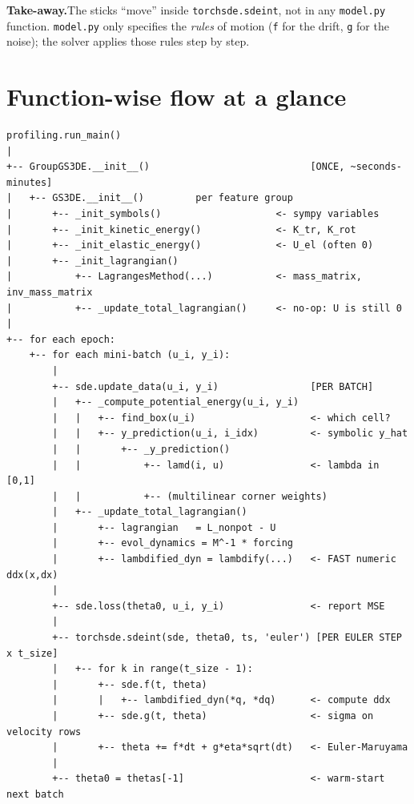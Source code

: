 \documentclass[11pt]{article}
\newcommand{\code}[1]{\texttt{\small #1}}
\begin{document}
\noindent\textbf{Take-away.}\quad The sticks ``move'' inside \code{torchsde.sdeint}, not in any \code{model.py} function. \code{model.py} only specifies the \emph{rules} of motion (\code{f} for the drift, \code{g} for the noise); the solver applies those rules step by step.

\section{Function-wise flow at a glance}

\begin{lstlisting}[basicstyle=\ttfamily\scriptsize]
profiling.run_main()
|
+-- GroupGS3DE.__init__()                            [ONCE, ~seconds-minutes]
|   +-- GS3DE.__init__()         per feature group
|       +-- _init_symbols()                    <- sympy variables
|       +-- _init_kinetic_energy()             <- K_tr, K_rot
|       +-- _init_elastic_energy()             <- U_el (often 0)
|       +-- _init_lagrangian()
|           +-- LagrangesMethod(...)           <- mass_matrix, inv_mass_matrix
|           +-- _update_total_lagrangian()     <- no-op: U is still 0
|
+-- for each epoch:
    +-- for each mini-batch (u_i, y_i):
        |
        +-- sde.update_data(u_i, y_i)                [PER BATCH]
        |   +-- _compute_potential_energy(u_i, y_i)
        |   |   +-- find_box(u_i)                    <- which cell?
        |   |   +-- y_prediction(u_i, i_idx)         <- symbolic y_hat
        |   |       +-- _y_prediction()
        |   |           +-- lamd(i, u)               <- lambda in [0,1]
        |   |           +-- (multilinear corner weights)
        |   +-- _update_total_lagrangian()
        |       +-- lagrangian   = L_nonpot - U
        |       +-- evol_dynamics = M^-1 * forcing
        |       +-- lambdified_dyn = lambdify(...)   <- FAST numeric ddx(x,dx)
        |
        +-- sde.loss(theta0, u_i, y_i)               <- report MSE
        |
        +-- torchsde.sdeint(sde, theta0, ts, 'euler') [PER EULER STEP x t_size]
        |   +-- for k in range(t_size - 1):
        |       +-- sde.f(t, theta)
        |       |   +-- lambdified_dyn(*q, *dq)      <- compute ddx
        |       +-- sde.g(t, theta)                  <- sigma on velocity rows
        |       +-- theta += f*dt + g*eta*sqrt(dt)   <- Euler-Maruyama
        |
        +-- theta0 = thetas[-1]                      <- warm-start next batch
\end{lstlisting}
\end{document}
